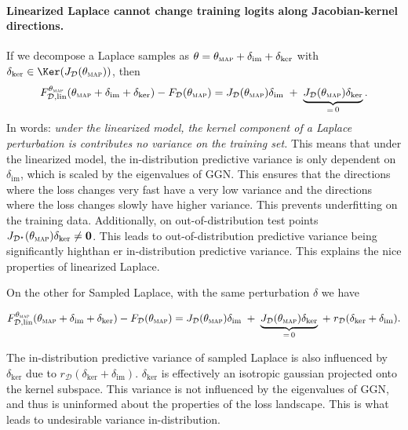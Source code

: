 \paragraph{Linearized Laplace cannot change training logits along Jacobian-kernel directions.}
If we decompose a Laplace samples as $\theta=\theta_{\textsc{map}}+\delta_{\mathrm{im}}+\delta_{\mathrm{ker}}$ with
$\delta_{\mathrm{ker}}\in\Ker(J_{\mathcal D}(\theta_{\textsc{map}}))$, then
\begin{align}
F^{\theta_{\textsc{map}}}_{\mathcal D,\mathrm{lin}}(\theta_{\textsc{map}}+\delta_{\mathrm{im}}+\delta_{\mathrm{ker}})
-
F_{\mathcal D}(\theta_{\textsc{map}}) = J_{\mathcal D}(\theta_{\textsc{map}})\delta_{\mathrm{im}}
\;+\;\underbrace{J_{\mathcal D}(\theta_{\textsc{map}})\delta_{\mathrm{ker}}}_{=\,0}
.
\label{eq:linlaplace_kernel_invariance_logits}
\end{align}
In words: \emph{under the linearized model, the kernel component of a Laplace perturbation is
contributes no variance on the training set.} This means that under the linearized model, the in-distribution predictive variance is only dependent on $\delta_\mathrm{im}$, which is scaled by the eigenvalues of $\textrm{GGN}$. This ensures that the directions where the loss changes very fast have a very low variance and the directions where the loss changes slowly have higher variance. This prevents underfitting on the training data. Additionally, on out-of-distribution test points $J_{\mathcal D^\star}(\theta_{\textsc{map}})\delta_{\mathrm{ker}} \neq \mathbf{0}$. This leads to out-of-distribution predictive variance being significantly highthan er in-distribution predictive variance. This explains the nice properties of linearized Laplace. 

On the other for Sampled Laplace, with the same perturbation $\delta$ we have

\begin{align}
F^{\theta_{\textsc{map}}}_{\mathcal D,\mathrm{lin}}(\theta_{\textsc{map}}+\delta_{\mathrm{im}}+\delta_{\mathrm{ker}})
-
F_{\mathcal D}(\theta_{\textsc{map}}) = J_{\mathcal D}(\theta_{\textsc{map}})\delta_{\mathrm{im}}
\;+\;\underbrace{J_{\mathcal D}(\theta_{\textsc{map}})\delta_{\mathrm{ker}}}_{=\,0} \;+\; r_\mathcal{D}(\delta_{\mathrm{ker}} + \delta_{\mathrm{im}})
.
\label{eq:laplace_kernel_invariance_logits}
\end{align}

The in-distribution predictive variance of sampled Laplace is also influenced by $\delta_{\mathrm{ker}}$ due to $r_\mathcal{D}(\delta_{\mathrm{ker}} + \delta_{\mathrm{im}})$. $\delta_{\mathrm{ker}}$ is effectively an isotropic gaussian projected onto the kernel subspace. This variance is not influenced by the eigenvalues of $\textrm{GGN}$, and thus is uninformed about the properties of the loss landscape. This is what leads to undesirable variance in-distribution.



